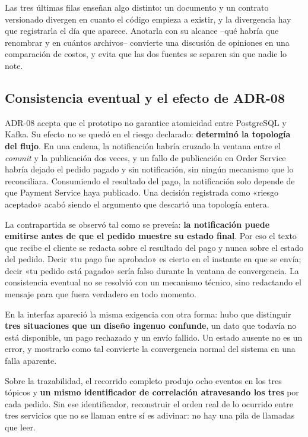 \documentclass[12pt,a4paper]{article}
\begin{document}
Las tres últimas filas enseñan algo distinto: un documento y un contrato versionado divergen en cuanto el código empieza a existir, y la divergencia hay que registrarla el día que aparece. Anotarla con su alcance --qué habría que renombrar y en cuántos archivos-- convierte una discusión de opiniones en una comparación de costos, y evita que las dos fuentes se separen sin que nadie lo note.

\subsection{Consistencia eventual y el efecto de ADR-08}

ADR-08 acepta que el prototipo no garantice atomicidad entre PostgreSQL y Kafka. Su efecto no se quedó en el riesgo declarado: \textbf{determinó la topología del flujo}. En una cadena, la notificación habría cruzado la ventana entre el \textit{commit} y la publicación dos veces, y un fallo de publicación en Order Service habría dejado el pedido pagado y sin notificación, sin ningún mecanismo que lo reconciliara. Consumiendo el resultado del pago, la notificación solo depende de que Payment Service haya publicado. Una decisión registrada como «riesgo aceptado» acabó siendo el argumento que descartó una topología entera.

La contrapartida se observó tal como se preveía: \textbf{la notificación puede emitirse antes de que el pedido muestre su estado final}. Por eso el texto que recibe el cliente se redacta sobre el resultado del pago y nunca sobre el estado del pedido. Decir «tu pago fue aprobado» es cierto en el instante en que se envía; decir «tu pedido está pagado» sería falso durante la ventana de convergencia. La consistencia eventual no se resolvió con un mecanismo técnico, sino redactando el mensaje para que fuera verdadero en todo momento.

En la interfaz apareció la misma exigencia con otra forma: hubo que distinguir \textbf{tres situaciones que un diseño ingenuo confunde}, un dato que todavía no está disponible, un pago rechazado y un envío fallido. Un estado ausente no es un error, y mostrarlo como tal convierte la convergencia normal del sistema en una falla aparente.

Sobre la trazabilidad, el recorrido completo produjo ocho eventos en los tres tópicos y \textbf{un mismo identificador de correlación atravesando los tres} por cada pedido. Sin ese identificador, reconstruir el orden real de lo ocurrido entre tres servicios que no se llaman entre sí es adivinar: no hay una pila de llamadas que leer.
\end{document}
